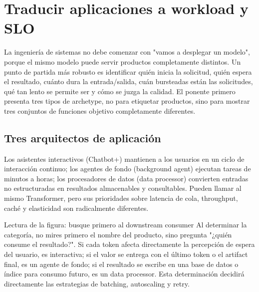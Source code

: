 \section{Traducir aplicaciones a workload y SLO}

La ingeniería de sistemas no debe comenzar con "vamos a desplegar un modelo", porque el mismo modelo puede servir productos completamente distintos. Un punto de partida más robusto es identificar quién inicia la solicitud, quién espera el resultado, cuánto dura la entrada/salida, cuán bursteadas están las solicitudes, qué tan lento se permite ser y cómo se juzga la calidad. El ponente primero presenta tres tipos de archetype, no para etiquetar productos, sino para mostrar tres conjuntos de funciones objetivo completamente diferentes.

\subsection{Tres arquitectos de aplicación}

Los asistentes interactivos (Chatbot+) mantienen a los usuarios en un ciclo de interacción continuo; los agentes de fondo (background agent) ejecutan tareas de minutos a horas; los procesadores de datos (data processor) convierten entradas no estructuradas en resultados almacenables y consultables. Pueden llamar al mismo Transformer, pero sus prioridades sobre latencia de cola, throughput, caché y elasticidad son radicalmente diferentes.


\begin{knowledgebox}{Lectura de la figura: busque primero al downstream consumer}
Al determinar la categoría, no mires primero el nombre del producto, sino pregunta "¿quién consume el resultado?". Si cada token afecta directamente la percepción de espera del usuario, es interactiva; si el valor se entrega con el último token o el artifact final, es un agente de fondo; si el resultado se escribe en una base de datos o índice para consumo futuro, es un data processor. Esta determinación decidirá directamente las estrategias de batching, autoscaling y retry.
\end{knowledgebox}

